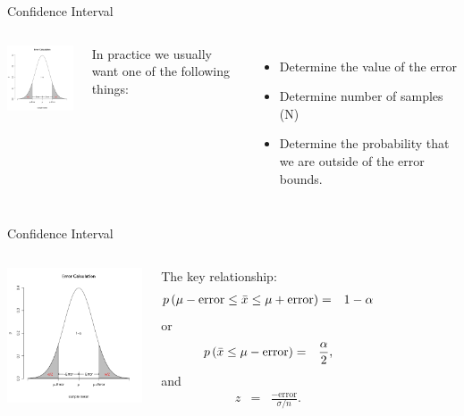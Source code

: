 \begin{frame}{Confidence Interval}

  \begin{columns}

    \centerline{\includegraphics[width=4cm]{img/confidenceInterval}}


    In practice we usually want one of the following things:
    \begin{itemize}
    \item Determine the value of the error
    \item Determine number of samples (N)
    \item Determine the probability that we are outside of the error bounds.
    \end{itemize}

  \end{columns}
  
\end{frame}


\begin{frame}{Confidence Interval}

  \begin{columns}
    \centerline{\includegraphics[width=4cm]{img/confidenceInterval}}

    The key relationship:
    \begin{eqnarray*}
      p\left( \mu-\mathrm{error} \leq \bar{x} \leq \mu + \mathrm{error}\right)
      & = & 1-\alpha
    \end{eqnarray*}
    or
    \begin{eqnarray*}
      p\left( \bar{x} \leq \mu-\mathrm{error} \right) & = & \frac{\alpha}{2},
    \end{eqnarray*}
    and
    \begin{eqnarray*}
      z & = & \frac{-\mathrm{error}}{\sigma/n}.
    \end{eqnarray*}

  \end{columns}

\end{frame}




